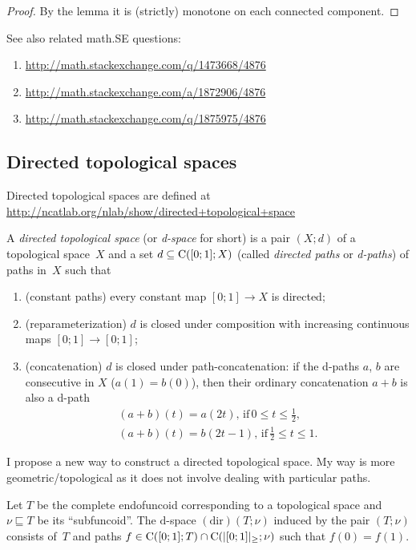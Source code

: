 \begin{proof}
By the lemma it is (strictly) monotone on each connected component.
\end{proof}

See also related math.SE questions:
\begin{enumerate}
\item \url{http://math.stackexchange.com/q/1473668/4876}
\item \url{http://math.stackexchange.com/a/1872906/4876}
\item \url{http://math.stackexchange.com/q/1875975/4876}
\end{enumerate}

\subsection{Directed topological spaces}

Directed topological spaces are defined at\\
\url{http://ncatlab.org/nlab/show/directed+topological+space}

\begin{defn}
A \emph{directed topological space} (or \emph{d-space} for short) is a pair $(X;d)$ of a topological space~$X$ and
a set $d\subseteq\mathrm{C}([0;1];X)$ (called \emph{directed paths} or \emph{d-paths}) of paths in~$X$ such that
\begin{enumerate}
\item (constant paths) every constant map $[0;1]\to X$ is directed;
\item (reparameterization) $d$ is closed under composition with increasing continuous maps $[0;1]\to [0;1]$;
\item (concatenation) $d$ is closed under path-concatenation: if the d-paths $a$, $b$ are consecutive in $X$ ($a(1)=b(0)$), then their ordinary concatenation $a+b$ is also a d-path
\begin{gather*}
(a+b)(t) = a(2t),\,\text{if}\, 0\le t\le \frac{1}{2}, \\
(a+b)(t) = b(2t-1),\,\text{if}\, \frac{1}{2}\le t\le 1.
\end{gather*}
\end{enumerate}
\end{defn}

I propose a new way to construct a directed topological space. My way is more geometric/topological as it does not involve dealing with particular paths.

\begin{defn}
Let $ T$ be the complete endofuncoid corresponding to a topological space
and $\nu\sqsubseteq T$ be its ``subfuncoid''. The $\mathrm{d}$-space $\operatorname{(dir)}(T;\nu)$ induced by the pair $(T;\nu)$
consists of~$ T$ and paths $f\in\mathrm{C}([0;1]; T) \cap \mathrm{C}(|[0;1]|_{\geq}; \nu)$
such that $f(0)=f(1)$.
\end{defn}

